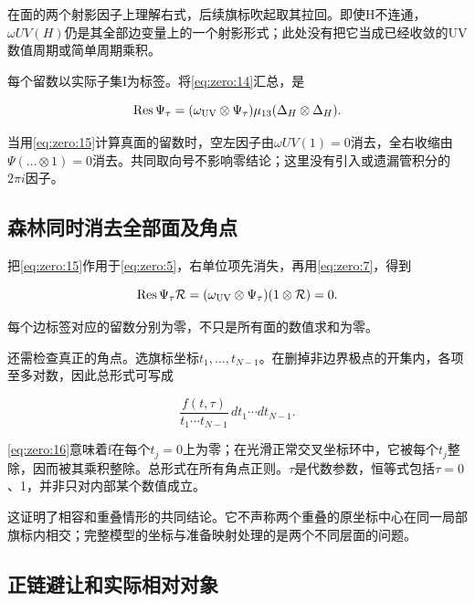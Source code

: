 \documentclass[11pt,a4paper,oneside]{ctexart}
\theoremstyle{cnplain}
\theoremstyle{definition}
\theoremstyle{remark}
\numberwithin{equation}{section}
\begin{document}
在面的两个射影因子上理解右式，后续旗标吹起取其拉回。即使H不连通，\(\omega UV(H)\)仍是其全部边变量上的一个射影形式；此处没有把它当成已经收敛的UV数值周期或简单周期乘积。

每个留数以实际子集I为标签。将\eqref{eq:zero:14}汇总，是

\begin{equation}
\operatorname{Res}\Psi_\tau
   =(\omega_{\rm UV}\otimes\Psi_\tau)
                         \mu_{13}(\Delta_H\otimes\Delta_H).   \label{eq:zero:15}
\end{equation}

当用\eqref{eq:zero:15}计算真面的留数时，空左因子由\(\omega UV(1)=0\)消去，全右收缩由\(\Psi (...\otimes 1)=0\)消去。共同取向号不影响零结论；这里没有引入或遗漏管积分的\(2\pi i\)因子。


\subsection{森林同时消去全部面及角点}\label{sec:zero:6}

把\eqref{eq:zero:15}作用于\eqref{eq:zero:5}，右单位项先消失，再用\eqref{eq:zero:7}，得到

\begin{equation}
\operatorname{Res}\Psi_\tau\mathcal R
 =(\omega_{\rm UV}\otimes\Psi_\tau)(1\otimes\mathcal R)=0.       \label{eq:zero:16}
\end{equation}

每个边标签对应的留数分别为零，不只是所有面的数值求和为零。

还需检查真正的角点。选旗标坐标\(t_1,...,t_{N- 1}\)。在删掉非边界极点的开集内，各项至多对数，因此总形式可写成

\begin{equation}
\frac{f(t,\tau)}{t_1\cdots t_{N-1}}\,
                 dt_1\cdots dt_{N-1}.
\end{equation}

\eqref{eq:zero:16}意味着f在每个\(t_j=0\)上为零；在光滑正常交叉坐标环中，它被每个\(t_j\)整除，因而被其乘积整除。总形式在所有角点正则。\(\tau \)是代数参数，恒等式包括\(\tau =0\)、1，并非只对内部某个数值成立。

这证明了相容和重叠情形的共同结论。它不声称两个重叠的原坐标中心在同一局部旗标内相交；完整模型的坐标与准备映射处理的是两个不同层面的问题。


\subsection{正链避让和实际相对对象}\label{sec:zero:7}
\end{document}
